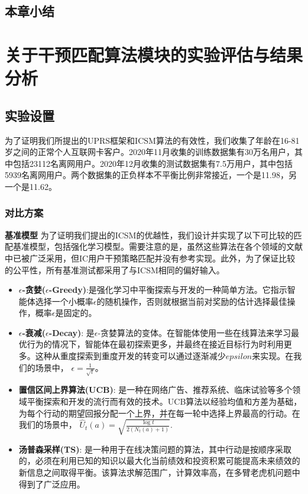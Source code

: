 \subsection{本章小结}
\newpage

\section{关于干预匹配算法模块的实验评估与结果分析}
\subsection{实验设置}
为了证明我们所提出的UPRS框架和ICSM算法的有效性，我们收集了年龄在16-81岁之间的正常个人互联网卡客户。2020年11月收集的训练数据集有30万名用户，其中包括23112名离网用户。2020年12月收集的测试数据集有7.5万用户，其中包括5939名离网用户。两个数据集的正负样本不平衡比例非常接近，一个是11.98，另一个是11.62。
\subsubsection{对比方案}
\textbf{基准模型}
为了证明我们提出的ICSM的优越性，我们设计并实现了以下可比较的匹配基准模型，包括强化学习模型。需要注意的是，虽然这些算法在各个领域的文献中已被广泛采用，但IC用户干预策略匹配并没有参考实现。此外，为了保证比较的公平性，所有基准测试都采用了与ICSM相同的偏好输入。

\begin{itemize}
	\item \textbf{$\epsilon$-贪婪($\epsilon$-Greedy)}:是强化学习中平衡探索与开发的一种简单方法。它指示智能体选择一个小概率$\epsilon$的随机操作，否则就根据当前对奖励的估计选择最佳操作，概率$\epsilon$是固定的。

	\item \textbf{$\epsilon$-衰减($\epsilon$-Decay)}: 是$\epsilon$-贪婪算法的变体。在智能体使用一些在线算法来学习最优行为的情况下，智能体在最初探索更多，并最终在接近目标行为时利用更多。这种从重度探索到重度开发的转变可以通过逐渐减少$epsilon$来实现。在我们的场景中，	$\epsilon = \frac{1}{\sqrt{t}}$。
	
	\item \textbf{置信区间上界算法(UCB)}: 是一种在网络广告、推荐系统、临床试验等多个领域平衡探索和开发的流行而有效的技术。UCB算法以经验均值和方差为基础，为每个行动的期望回报分配一个上界，并在每一轮中选择上界最高的行动。在我们的场景中， $\hat{U}_{t}(a) = \sqrt{\frac{\log t}{2(N_{t}(a)+1)}}$.
	
	\item \textbf{汤普森采样(TS)}: 是一种用于在线决策问题的算法，其中行动是按顺序采取的，必须在利用已知的知识以最大化当前绩效和投资积累可能提高未来绩效的新信息之间取得平衡。该算法求解范围广，计算效率高，在多臂老虎机问题中得到了广泛应用。
\end{itemize}

